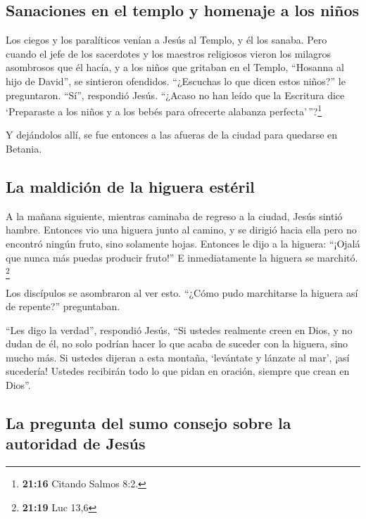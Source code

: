 \hypertarget{sanaciones-en-el-templo-y-homenaje-a-los-niuxf1os}{%
\subsection{Sanaciones en el templo y homenaje a los
niños}\label{sanaciones-en-el-templo-y-homenaje-a-los-niuxf1os}}

 Los ciegos y los paralíticos venían a Jesús al Templo, y
él los sanaba.  Pero cuando el jefe de los sacerdotes y
los maestros religiosos vieron los milagros asombrosos que él hacía, y a
los niños que gritaban en el Templo, ``Hosanna al hijo de David'', se
sintieron ofendidos. ``¿Escuchas lo que dicen estos niños?'' le
preguntaron.  ``Sí'', respondió Jesús. ``¿Acaso no han
leído que la Escritura dice `Preparaste a los niños y a los bebés para
ofrecerte alabanza perfecta'\,''?\footnote{\textbf{21:16} Citando Salmos
  8:2.}

 Y dejándolos allí, se fue entonces a las afueras de la
ciudad para quedarse en Betania.

\hypertarget{la-maldiciuxf3n-de-la-higuera-estuxe9ril}{%
\subsection{La maldición de la higuera
estéril}\label{la-maldiciuxf3n-de-la-higuera-estuxe9ril}}

 A la mañana siguiente, mientras caminaba de regreso a la
ciudad, Jesús sintió hambre.  Entonces vio una higuera
junto al camino, y se dirigió hacia ella pero no encontró ningún fruto,
sino solamente hojas. Entonces le dijo a la higuera: ``¡Ojalá que nunca
más puedas producir fruto!'' E inmediatamente la higuera se marchitó.
\footnote{\textbf{21:19} Luc 13,6}

 Los discípulos se asombraron al ver esto. ``¿Cómo pudo
marchitarse la higuera así de repente?'' preguntaban.

 ``Les digo la verdad'', respondió Jesús, ``Si ustedes
realmente creen en Dios, y no dudan de él, no solo podrían hacer lo que
acaba de suceder con la higuera, sino mucho más. Si ustedes dijeran a
esta montaña, `levántate y lánzate al mar', ¡así sucedería!
 Ustedes recibirán todo lo que pidan en oración, siempre
que crean en Dios''.

\hypertarget{la-pregunta-del-sumo-consejo-sobre-la-autoridad-de-jesuxfas}{%
\subsection{La pregunta del sumo consejo sobre la autoridad de
Jesús}\label{la-pregunta-del-sumo-consejo-sobre-la-autoridad-de-jesuxfas}}

